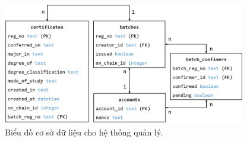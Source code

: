 \begin{figure}[!ht]
    \centering
    \includegraphics[width=400px]{images/database.png}
    \caption{Biểu đồ cơ sở dữ liệu cho hệ thống quản lý.}
\end{figure}

